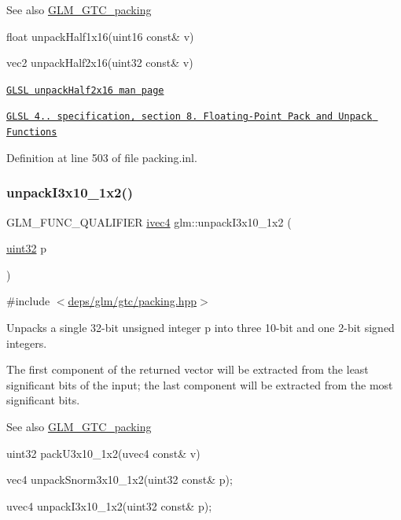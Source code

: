 \begin{DoxySeeAlso}{See also}
\hyperlink{group__gtc__packing}{G\+L\+M\+\_\+\+G\+T\+C\+\_\+packing} 

float unpack\+Half1x16(uint16 const\& v) 

vec2 unpack\+Half2x16(uint32 const\& v) 

\href{http://www.opengl.org/sdk/docs/manglsl/xhtml/unpackHalf2x16.xml}{\tt G\+L\+SL unpack\+Half2x16 man page} 

\href{http://www.opengl.org/registry/doc/GLSLangSpec.4.20.8.pdf}{\tt G\+L\+SL 4.. specification, section 8. Floating-\/\+Point Pack and Unpack Functions} 
\end{DoxySeeAlso}


Definition at line 503 of file packing.\+inl.

\mbox{\label{group__gtc__packing_ga08bcd34cf9c34701d658dd861ee6e300}} 
\subsubsection{\texorpdfstring{unpack\+I3x10\+\_\+1x2()}{unpackI3x10\_1x2()}}
{\footnotesize\ttfamily G\+L\+M\+\_\+\+F\+U\+N\+C\+\_\+\+Q\+U\+A\+L\+I\+F\+I\+ER \hyperlink{group__core__types_gaa4560ddc50320ea8f8a70d5c9c249fea}{ivec4} glm\+::unpack\+I3x10\+\_\+1x2 (\begin{DoxyParamCaption}\item[{\hyperlink{group__gtc__type__precision_ga202b6a53c105fcb7e531f9b443518451}{uint32}}]{p }\end{DoxyParamCaption})}



{\ttfamily \#include $<$\hyperlink{gtc_2packing_8hpp}{deps/glm/gtc/packing.\+hpp}$>$}

Unpacks a single 32-\/bit unsigned integer p into three 10-\/bit and one 2-\/bit signed integers.

The first component of the returned vector will be extracted from the least significant bits of the input; the last component will be extracted from the most significant bits.

\begin{DoxySeeAlso}{See also}
\hyperlink{group__gtc__packing}{G\+L\+M\+\_\+\+G\+T\+C\+\_\+packing} 

uint32 pack\+U3x10\+\_\+1x2(uvec4 const\& v) 

vec4 unpack\+Snorm3x10\+\_\+1x2(uint32 const\& p); 

uvec4 unpack\+I3x10\+\_\+1x2(uint32 const\& p); 
\end{DoxySeeAlso}


